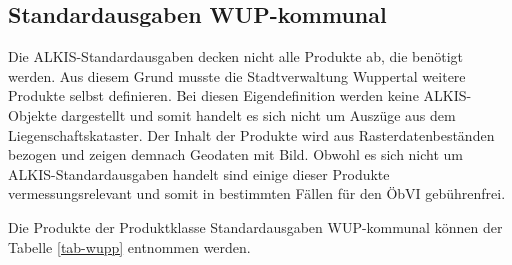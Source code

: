 \subsection{Standardausgaben WUP-kommunal}

Die ALKIS-Standardausgaben decken nicht alle Produkte ab, die benötigt werden. Aus diesem Grund musste die Stadtverwaltung Wuppertal weitere Produkte selbst definieren.
Bei diesen Eigendefinition werden keine ALKIS-Objekte dargestellt und somit handelt es sich nicht um Auszüge aus dem Liegenschaftskataster.
Der Inhalt der Produkte wird aus Rasterdatenbeständen bezogen und zeigen demnach Geodaten mit Bild.
Obwohl es sich nicht um ALKIS-Standardausgaben handelt sind einige dieser Produkte vermessungsrelevant und somit in bestimmten Fällen für den ÖbVI gebührenfrei.

Die Produkte der Produktklasse Standardausgaben WUP-kommunal können der Tabelle \vref{tab-wupp} entnommen werden.


